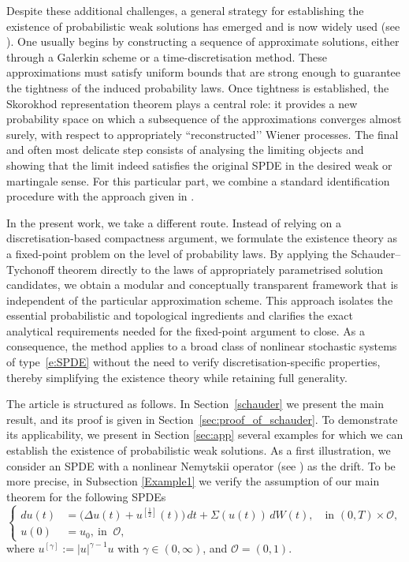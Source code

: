\documentclass[english,a4paper,11pt]{amsart}
\theoremstyle{plain}
\theoremstyle{definition}
\theoremstyle{remark}
\numberwithin{equation}{section}
\newcommand{\Ocal} {{\mathcal O}}
\begin{document}
Despite these additional challenges, a general strategy for establishing the 
existence of probabilistic weak solutions has emerged and is now widely used (see \cite{CP1997,weiroeckner}). 
One usually begins by constructing a sequence of approximate solutions, either 
through a Galerkin scheme or a time-discretisation method. These approximations 
must satisfy uniform bounds that are strong enough to guarantee the tightness of the 
induced probability laws. Once tightness is established, the Skorokhod 
representation theorem plays a central role: it provides a new probability space 
on which a subsequence of the approximations converges almost surely, with 
respect to appropriately ``reconstructed’’ Wiener processes. The final and often 
most delicate step consists of analysing the limiting objects and showing that 
the limit indeed satisfies the original SPDE in the desired weak or 
martingale sense. For this particular part, we combine a standard identification procedure with the approach given in  \cite{weiroeckner}.


In the present work, we take a different route. Instead of relying on a 
discretisation-based compactness argument, we formulate the existence theory as a 
fixed-point problem on the level of probability laws. By applying the 
Schauder--Tychonoff theorem directly to the laws of appropriately parametrised 
solution candidates, we obtain a modular and conceptually transparent framework that is independent of the particular approximation scheme. This approach 
isolates the essential probabilistic and topological ingredients and clarifies 
the exact analytical requirements needed for the fixed-point argument to close. 
As a consequence, the method applies to a broad class of nonlinear stochastic 
systems of type~\eqref{e:SPDE} without the need to verify discretisation-specific 
properties, thereby simplifying the existence theory while retaining full 
generality.


The article is structured as follows. In Section~\ref{schauder} we present the main result, and its proof is given in Section~\ref{sec:proof_of_schauder}.
%
To demonstrate its applicability, we present in Section  \ref{sec:app}  several examples for which we can establish the existence of probabilistic weak solutions.	As a first illustration, we consider an SPDE with a nonlinear Nemytskii operator (see \cite{runst}) as the drift. To be more precise,  in Subsection \ref{Example1} we verify the assumption of our main theorem for the following SPDEs
\begin{equation*}
	\left\{
	\begin{aligned}
		d u(t)&= \big(\Delta u(t)+u^{[\frac{1}{2}]}(t)\big)\,d t+\Sigma (u(t))\,dW(t), \quad \text{in } (0,T)\times \Ocal,\\
		u(0)&=u_0,\ \text{in }\ \Ocal,
	\end{aligned}
	\right.
\end{equation*}where $u^{[\gamma]}:=|u|^{\gamma-1}u$ with $\gamma \in (0,\infty)$, and $\mathcal{O}=(0,1)$. 
\end{document}
